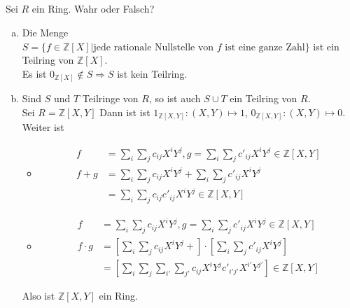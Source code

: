 \documentclass{article}
\newcommand{\Z}{\mathbb{Z}}
\begin{document}
\subsection{}
\color{blue}
Sei $R$ ein Ring. Wahr oder Falsch?
\color{black}
\begin{enumerate}[(a)]
    \item
        \color{blue}
        Die Menge $S=\{f\in\Z[X]|\text{jede rationale
        Nullstelle von $f$ ist eine ganze Zahl}\}$
        ist ein Teilring von $\Z[X]$.\\
        \color{black}
        Es ist $0_{\Z[X]}\notin S\Rightarrow S$ ist
        kein Teilring.
    \item
        \color{blue}
        Sind $S$ und $T$ Teilringe von $R$, so ist auch
        $S\cup T$ ein Teilring von $R$.\\
        \color{black}
        Sei $R=\Z[X,Y]$
        Dann ist ist $1_{\Z[X,Y]}:(X,Y)\mapsto 1$,
        $0_{\Z[X,Y]}:(X,Y)\mapsto 0$.
        Weiter ist
        \begin{itemize}
            \item
                \begin{align*}
                    f&=\sum_i\sum_j c_{ij}X^iY^j,
                    g=\sum_i\sum_j c'_{ij}X^iY^j\in\Z[X,Y]\\
                    f+g&=\sum_i\sum_j c_{ij}X^iY^j+
                    \sum_i\sum_j c'_{ij}X^iY^j\\
                    &=\sum_i\sum_j c_{ij}c'_{ij}X^iY^j
                    \in\Z[X,Y]
                \end{align*}
            \item
                \begin{align*}
                    f&=\sum_i\sum_j c_{ij}X^iY^j,
                    g=\sum_i\sum_j c'_{ij}X^iY^j\in\Z[X,Y]\\
                    f\cdot g&=
                    \left[
                        \sum_i\sum_j c_{ij}X^iY^j+
                    \right]\cdot
                    \left[
                        \sum_i\sum_j c'_{ij}X^iY^j
                    \right]\\
                    &=
                    \left[
                        \sum_i\sum_j
                        \sum_{i'}\sum_{j'}
                        c_{ij}X^iY^j
                        c'_{i'j'}X^{i'}Y^{j'}
                    \right]\in\Z[X,Y]
                \end{align*}
        \end{itemize}
        Also ist $\Z[X,Y]$ ein Ring.


\end{enumerate}
\end{document}
